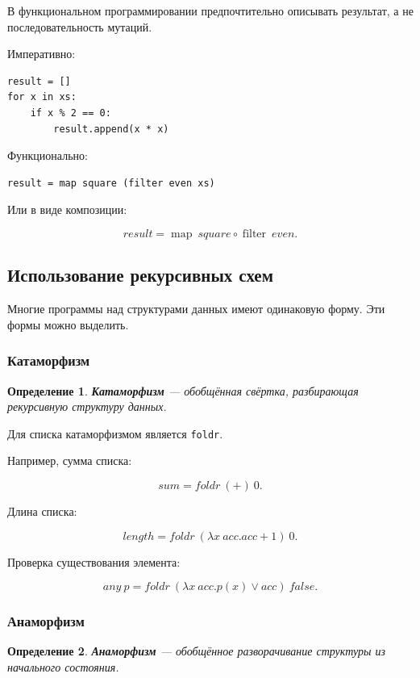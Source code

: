 \documentclass[12pt,a4paper]{article}
\newtheorem{definition}{Определение}
\begin{document}
В функциональном программировании предпочтительно описывать результат, а не последовательность мутаций.

Императивно:

\begin{lstlisting}
result = []
for x in xs:
    if x % 2 == 0:
        result.append(x * x)
\end{lstlisting}

Функционально:

\begin{lstlisting}
result = map square (filter even xs)
\end{lstlisting}

Или в виде композиции:

\[
result = \operatorname{map}\ square \circ \operatorname{filter}\ even.
\]

\subsection{Использование рекурсивных схем}

Многие программы над структурами данных имеют одинаковую форму. Эти формы можно выделить.

\subsubsection{Катаморфизм}

\begin{definition}
\textbf{Катаморфизм} --- обобщённая свёртка, разбирающая рекурсивную структуру данных.
\end{definition}

Для списка катаморфизмом является \texttt{foldr}.

Например, сумма списка:

\[
sum = foldr\ (+)\ 0.
\]

Длина списка:

\[
length = foldr\ (\lambda x\ acc. acc + 1)\ 0.
\]

Проверка существования элемента:

\[
any\ p = foldr\ (\lambda x\ acc. p(x) \lor acc)\ false.
\]

\subsubsection{Анаморфизм}

\begin{definition}
\textbf{Анаморфизм} --- обобщённое разворачивание структуры из начального состояния.
\end{definition}
\end{document}
